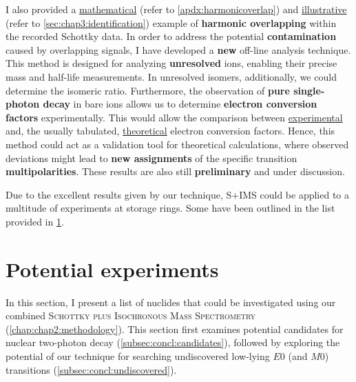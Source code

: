 I also provided a \underline{mathematical} (refer to \cref{apdx:harmonicoverlap}) and \underline{illustrative} (refer to \cref{sec:chap3:identification}) example of \textbf{harmonic overlapping} within the recorded Schottky data. In order to address the potential \textbf{contamination} caused by overlapping signals, I have developed a \textbf{new} off-line analysis technique. This method is designed for analyzing \textbf{unresolved} ions, enabling their precise mass and half-life measurements. In unresolved isomers, additionally, we could determine the isomeric ratio.
Furthermore, the observation of \textbf{pure single-photon decay} in bare ions allows us to determine \textbf{electron conversion factors} experimentally. This would allow the comparison between \underline{experimental} and, the usually tabulated, \underline{theoretical} electron conversion factors. Hence, this method could act as a validation tool for theoretical calculations, where observed deviations might lead to \textbf{new assignments} of the specific transition \textbf{multipolarities}. These results are also still \textbf{preliminary} and under discussion.

Due to the excellent results given by our technique, \textsc{S+IMS} could be applied to a multitude of experiments at storage rings. Some have been outlined in the list provided in \cref{sec:concl:potential}.

\section{Potential experiments}\label{sec:concl:potential}
In this section, I present a list of nuclides that could be investigated using our combined \textsc{Schottky plus Isochronous Mass Spectrometry} (\cref{chap:chap2:methodology}). This section first examines potential candidates for nuclear two-photon decay (\cref{subsec:concl:candidates}), followed by exploring the potential of our technique for searching undiscovered low-lying $E0$ (and $M0$) transitions (\cref{subsec:concl:undiscovered}).

